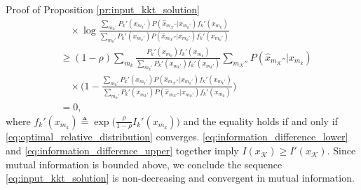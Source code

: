 \documentclass[journal]{IEEEtran}
\begin{document}
\begin{appendix}
\begin{subsection}{Proof of Proposition \ref{pr:input_kkt_solution}}
\begin{subequations}
\begin{align}
				 & \quad \times \log \frac{\sum_{m_k'} P_k'(x_{m_k'}) P(\hat{x}_{m_{\mathcal{K}}''}|x_{m_k'}) f_k'(x_{m_k})}{\sum_{m_k'} P_k'(x_{m_k'}) P(\hat{x}_{m_{\mathcal{K}}''}|x_{m_k'}) f_k'(x_{m_k'})}                \\
				 & \ge (1 - \rho) \sum_{m_k} \frac{P_k'(x_{m_k}) f_k'(x_{m_k})}{\sum_{m_k'} P_k'(x_{m_k'}) f_k'(x_{m_k'})} \sum_{m_{\mathcal{K}}''} P(\hat{x}_{m_{\mathcal{K}}''}|x_{m_k})\nonumber                            \\
				 & \quad \times \Biggl( 1 - \frac{\sum_{m_k'} P_k'(x_{m_k'}) P(\hat{x}_{m_{\mathcal{K}}''}|x_{m_k'}) f_k'(x_{m_k'})}{\sum_{m_k'} P_k'(x_{m_k'}) P(\hat{x}_{m_{\mathcal{K}}''}|x_{m_k'}) f_k'(x_{m_k})} \Biggr) \\
				 & = 0,
			\end{align}
		\end{subequations}
		where $f_k'(x_{m_k}) \triangleq \exp \bigl( \frac{\rho}{1 - \rho} I_k'(x_{m_k}) \bigr)$ and the equality holds if and only if \eqref{eq:optimal_relative_distribution} converges.
		\eqref{eq:information_difference_lower} and \eqref{eq:information_difference_upper} together imply $I(x_{\mathcal{K}}) \ge I'(x_{\mathcal{K}})$.
		Since mutual information is bounded above, we conclude the sequence \eqref{eq:input_kkt_solution} is non-decreasing and convergent in mutual information.


\end{subsection}
\end{appendix}
\end{document}
